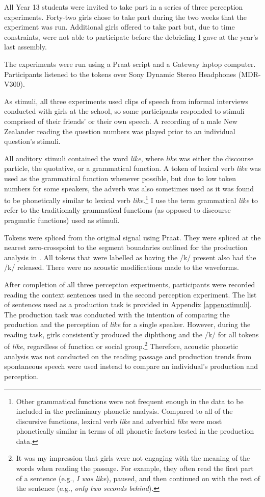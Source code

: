 All Year 13 students were invited to take part in a series of three perception experiments. Forty-two girls chose to take part during the two weeks that the experiment was run. Additional girls offered to take part but, due to time constraints, were not able to participate before the debriefing I gave at the year's last assembly. 

The experiments were run using a Praat script and a Gateway laptop computer. Participants listened to the tokens over Sony Dynamic Stereo Headphones (MDR-V300).

As stimuli, all three experiments used clips of speech from informal interviews conducted with girls at the school, so some participants responded to stimuli comprised of their friends' or their own speech.  A recording of a male New Zealander reading the question numbers was played prior to an individual question's stimuli.
 
All auditory stimuli contained the word \textit{like}, where \textit{like} was either the discourse particle, the quotative, or a grammatical function. A token of lexical verb \textit{like} was used as the grammatical function whenever possible, but due to low token numbers for some speakers, the adverb was also sometimes used as it was found to be phonetically similar to lexical verb \textit{like}.\footnote{Other grammatical functions were not frequent enough in the data to be included in the preliminary phonetic analysis. Compared to all of the discursive functions, lexical verb \textit{like} and adverbial \textit{like} were most phonetically similar in terms of all phonetic factors tested in the production data.} I use the term grammatical \textit{like} to refer to the traditionally grammatical functions (as opposed to discourse pragmatic functions) used as stimuli. 

Tokens were spliced from the original signal using Praat. They were spliced at the nearest zero-crosspoint to the segment boundaries outlined for the production analysis in . All tokens that were labelled as having the /k/ present also had the /k/ released. There were no acoustic modifications made to the waveforms. 
 
After completion of all three perception experiments, participants were re\-cor\-ded reading the context sentences used in the second perception experiment. The list of sentences used as a production task is provided in Appendix \ref{appen:stimuli}. The production task was conducted with the intention of comparing the production and the perception of \textit{like} for a single speaker. However, during the reading task, girls consistently produced the diphthong and the /k/ for all tokens of \textit{like}, regardless of function or social group.\footnote{It was my impression that girls were not engaging with the meaning of the words when reading the passage. For example, they often read the first part of a sentence (e.g., \textit{I was like}), paused, and then continued on with the rest of the sentence (e.g., \textit{only two seconds behind}).} Therefore, acoustic phonetic analysis was not conducted on the reading passage and production trends from spontaneous speech were used instead to compare an individual's production and perception. 

